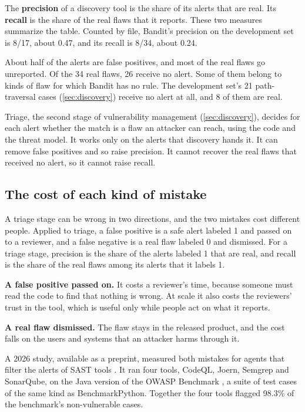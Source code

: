 The \textbf{precision} of a discovery tool is the share of its alerts that are real. Its
\textbf{recall} is the share of the real flaws that it reports. These two measures summarize the
table. Counted by file, Bandit's precision on the development set is 8/17, about 0.47, and its
recall is 8/34, about 0.24.

About half of the alerts are false positives, and most of the real flaws go unreported. Of the 34
real flaws, 26 receive no alert. Some of them belong to kinds of flaw for which Bandit has no rule.
The development set's 21 path-traversal cases (\cref{sec:discovery}) receive no alert at all, and 8
of them are real.

Triage, the second stage of vulnerability management (\cref{sec:discovery}), decides for each alert
whether the match is a flaw an attacker can reach, using the code and the threat model. It works
only on the alerts that discovery hands it. It can remove false positives and so raise precision. It
cannot recover the real flaws that received no alert, so it cannot raise recall.

\subsection{The cost of each kind of mistake}
\label{sec:triage-cost}

A triage stage can be wrong in two directions, and the two mistakes cost different people. Applied to
triage, a false positive is a safe alert labeled 1 and passed on to a reviewer, and a false negative
is a real flaw labeled 0 and dismissed. For a triage stage, precision is the share of the alerts
labeled 1 that are real, and recall is the share of the real flaws among its alerts that it labels 1.
\bi
\item \textbf{A false positive passed on.} It costs a reviewer's time, because someone must read the
code to find that nothing is wrong. At scale it also costs the reviewers' trust in the tool, which is
useful only while people act on what it reports.
\item \textbf{A real flaw dismissed.} The flaw stays in the released product, and the cost falls on
the users and systems that an attacker harms through it.
\ei

A 2026 study, available as a preprint, measured both mistakes for agents that filter the alerts of
SAST tools \citep{xiong2026sifting}. It ran four tools, CodeQL, Joern, Semgrep and SonarQube, on the
Java version of the OWASP Benchmark \citep{owasp-benchmark}, a suite of test cases of the same kind
as BenchmarkPython. Together the four tools flagged 98.3\% of the benchmark's non-vulnerable cases.

